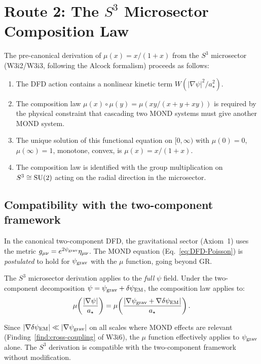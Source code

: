 \documentclass[11pt]{article}
\newcommand{\psigrav}{\psi_{\rm grav}}
\newcommand{\dpsiEM}{\delta\psi_{\rm EM}}
\newcommand{\mufd}{\mu}
\begin{document}
\section{Route 2: The $S^3$ Microsector Composition Law}
\label{sec:route2}

The pre-canonical derivation of $\mufd(x) = x/(1+x)$ from the $S^3$
microsector (W3i2/W3i3, following the Alcock formalism) proceeds as
follows:

\begin{enumerate}
\item The DFD action contains a nonlinear kinetic term $W(|\nabla\psi|^2/a_\star^2)$.
\item The composition law $\mufd(x) \circ \mufd(y) = \mufd(xy/(x+y+xy))$
  is required by the physical constraint that cascading two MOND systems
  must give another MOND system.
\item The unique solution of this functional equation on $[0,\infty)$
  with $\mufd(0) = 0$, $\mufd(\infty) = 1$, monotone, convex, is
  $\mufd(x) = x/(1+x)$.
\item The composition law is identified with the group multiplication
  on $S^3 \cong {\rm SU}(2)$ acting on the radial direction in the
  microsector.
\end{enumerate}

\subsection{Compatibility with the two-component framework}

In the canonical two-component DFD, the gravitational sector
(Axiom~1) uses the metric $g_{\mu\nu} = e^{2\psigrav}\eta_{\mu\nu}$.
The MOND equation (Eq.~\ref{eq:DFD-Poisson}) is \emph{postulated}
to hold for $\psigrav$ with the $\mufd$ function, going beyond GR.

The $S^3$ microsector derivation applies to the \emph{full} $\psi$
field. Under the two-component decomposition $\psi = \psigrav + \dpsiEM$,
the composition law applies to:
\begin{equation}
\mufd\!\left(\frac{|\nabla\psi|}{a_\star}\right)
= \mufd\!\left(\frac{|\nabla\psigrav + \nabla\dpsiEM|}{a_\star}\right).
\label{eq:mu-total}
\end{equation}

Since $|\nabla\dpsiEM| \ll |\nabla\psigrav|$ on all scales where
MOND effects are relevant (Finding~\ref{find:cross-coupling} of W3i6),
the $\mufd$ function effectively applies to $\psigrav$ alone. The
$S^3$ derivation is compatible with the two-component framework
without modification.
\end{document}
